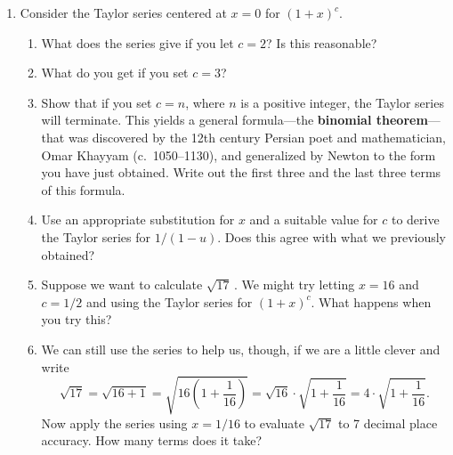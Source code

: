 \begin{enumerate}
\begin{enumerate}
  \item Now find the Taylor series centered at $x=0$ for $\sinh(x)$.
Compare your results to the Taylor series centered at $x=0$ for
$\sin(x)$.

  \item Parts (a) and (b) of this problem should begin to explain the
     {\em trigonometric} part of the story.  What about the {\em
       hyperbolic} part?  Recall that the familiar trigonometric
     functions are called {\em circular functions} because, for any~$t$,
     the point $(\cos t, \sin t)$ is on the unit circle with equation
     $x^2 + y^2 =1$ (cf.\ chapter~7.2).  Show that the point $(\cosh
     t, \sinh t)$ lies on the hyperbola with equation $x^2 - y^2 = 1$.


\end{enumerate}
\item Consider the Taylor series centered at $x=0$ for $(1+x)^c$.

  \begin{enumerate}
  \item What does the series give if you let $c=2$?  Is this reasonable?

  \item What do you get if you set $c=3$?

  \item Show that if you set $c=n$, where $n$ is a positive integer, the
Taylor series will terminate. This yields a general formula---the {\bf
  binomial theorem}---that was discovered by
the 12th century Persian poet and mathematician, Omar
Khayyam (c.\ 1050--1130), and generalized by
Newton to the form you have just obtained.  Write out the first three
and the last three terms of this formula.

  \item Use an appropriate substitution for $x$ and a suitable value for
$c$ to derive the Taylor series for $1/(1-u)$. Does this agree with
what we previously obtained?

  \item Suppose we want to calculate $\sqrt{17} \,$. We might try letting
$x=16$ and $c=1/2$ and using the Taylor series for $(1+x)^c$.  What
happens when you try this?

  \item We can still use the series to help us, though, if we are a
little clever and write
\[
\sqrt{17} =\sqrt{16+1} = \sqrt{16\left(1+\dfrac{1}{16}\right)} 
    =\sqrt{16}\cdot\sqrt{1+ \dfrac{1}{16}}
    = 4 \cdot \sqrt{1 + \dfrac{1}{16}}.
\]
Now apply the series using $x=1/16$ to evaluate $\sqrt{17}$ to 7
decimal place accuracy.  How many terms does it take?


\end{enumerate}
\end{enumerate}
